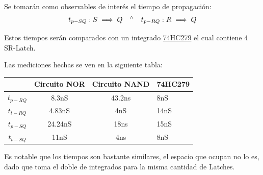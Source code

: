 Se tomarán como observables  de interés el tiempo de propagación:
\begin{align} t_{p-SQ}: S \implies Q \ \ \ \textsuperscript{$\wedge$} \ \ \ t_{p-RQ}: R \implies Q \end{align} 

Estos tiempos serán comparados con un integrado \href{http://noel.feld.cvut.cz/hw/st/1937.pdf}{74HC279} el cual contiene 4 SR-Latch.

Las mediciones hechas se ven en la siguiente tabla:
\begin{table}[H]
\centering
\begin{tabular}{cccl}
\textit{}           & \textbf{Circuito NOR} & \textbf{Circuito NAND} & \textbf{74HC279} \\ \hline
\textbf{$t_{p-RQ}$} & 8.3nS                 & 43.2ns                 & 8nS              \\
\textbf{$t_{t-RQ}$} & 4.83nS                & 4nS                    & 14nS             \\
\textbf{$t_{p-SQ}$} & 24.24nS               & 18ns                   & 15nS             \\
\textbf{$t_{t-SQ}$} & 11nS                  & 4ns                    & 8nS             
\end{tabular}
\end{table}
Es notable que los tiempos son bastante similares, el espacio que ocupan no lo es, dado que toma el doble de integrados para la misma cantidad de Latches. 
